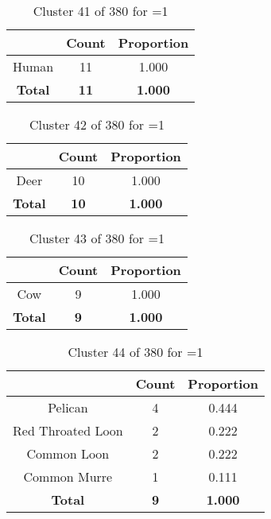 \begin{table}[ht!]
\centering
\begin{tabular}{|c|c|c|}
\hline
\bf \Spec{} &\bf Count &\bf Proportion\\ \hline \hline
Human & 11 & 1.000\\ \hline
\hline
\bf Total & \bf 11 & \bf 1.000\\ \hline
\end{tabular}
\label{tab:cluster:41:1}
\caption{Cluster 41 of 380 for \minneigh{}=1}
\end{table}

\begin{table}[ht!]
\centering
\begin{tabular}{|c|c|c|}
\hline
\bf \Spec{} &\bf Count &\bf Proportion\\ \hline \hline
Deer & 10 & 1.000\\ \hline
\hline
\bf Total & \bf 10 & \bf 1.000\\ \hline
\end{tabular}
\label{tab:cluster:42:1}
\caption{Cluster 42 of 380 for \minneigh{}=1}
\end{table}

\begin{table}[ht!]
\centering
\begin{tabular}{|c|c|c|}
\hline
\bf \Spec{} &\bf Count &\bf Proportion\\ \hline \hline
Cow & 9 & 1.000\\ \hline
\hline
\bf Total & \bf 9 & \bf 1.000\\ \hline
\end{tabular}
\label{tab:cluster:43:1}
\caption{Cluster 43 of 380 for \minneigh{}=1}
\end{table}

\begin{table}[ht!]
\centering
\begin{tabular}{|c|c|c|}
\hline
\bf \Spec{} &\bf Count &\bf Proportion\\ \hline \hline
Pelican & 4 & 0.444\\ \hline
Red Throated Loon & 2 & 0.222\\ \hline
Common Loon & 2 & 0.222\\ \hline
Common Murre & 1 & 0.111\\ \hline
\hline
\bf Total & \bf 9 & \bf 1.000\\ \hline
\end{tabular}
\label{tab:cluster:44:1}
\caption{Cluster 44 of 380 for \minneigh{}=1}
\end{table}

